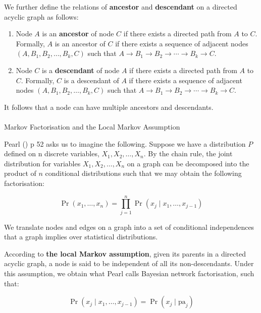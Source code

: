 \documentclass[
  single column]{article}
\makeatletter
\let\oldparagraph\paragraph
\renewcommand{\paragraph}{
    \@ifstar
      \xxxParagraphStar
      \xxxParagraphNoStar
  }
\newcommand{\xxxParagraphStar}[1]{\oldparagraph*{#1}\mbox{}}
\newcommand{\xxxParagraphNoStar}[1]{\oldparagraph{#1}\mbox{}}
\providecommand{\tightlist}{%
  \setlength{\itemsep}{0pt}\setlength{\parskip}{0pt}}\usepackage{longtable,booktabs,array}
\makeatother
\begin{document}
We further define the relations of \textbf{ancestor} and
\textbf{descendant} on a directed acyclic graph as follows:

\begin{enumerate}
\def\labelenumi{\arabic{enumi}.}
\tightlist
\item
  Node \(A\) is an \textbf{ancestor} of node \(C\) if there exists a
  directed path from \(A\) to \(C\). Formally, \(A\) is an ancestor of
  \(C\) if there exists a sequence of adjacent nodes
  \((A, B_1, B_2, \ldots, B_k, C)\) such that
  \(A \rightarrow B_1 \rightarrow B_2 \rightarrow \cdots \rightarrow B_k \rightarrow C\).
\item
  Node \(C\) is a \textbf{descendant} of node \(A\) if there exists a
  directed path from \(A\) to \(C\). Formally, \(C\) is a descendant of
  \(A\) if there exists a sequence of adjacent nodes
  \((A, B_1, B_2, \ldots, B_k, C)\) such that
  \(A \rightarrow B_1 \rightarrow B_2 \rightarrow \cdots \rightarrow B_k \rightarrow C\).
\end{enumerate}

It follows that a node can have multiple ancestors and descendants.

\paragraph{Markov Factorisation and the Local Markov
Assumption}\label{markov-factorisation-and-the-local-markov-assumption}

Pearl () p 52 asks us to imagine the
following. Suppose we have a distribution \(P\) defined on n discrete
variables, \(X_1, X_2, \dots, X_n\). By the chain rule, the joint
distribution for variables \(X_1, X_2, \dots, X_n\) on a graph can be
decomposed into the product of \(n\) conditional distributions such that
we may obtain the following factorisation:

\[
\Pr(x_1, \dots, x_n) = \prod_{j=1}^n \Pr(x_j \mid x_1, \dots, x_{j-1})
\]

We translate nodes and edges on a graph into a set of conditional
independences that a graph implies over statistical distributions.

According to \textbf{the local Markov assumption}, given its parents in
a directed acyclic graph, a node is said to be independent of all its
non-descendants. Under this assumption, we obtain what Pearl calls
Bayesian network factorisation, such that:

\[
\Pr(x_j \mid x_1, \dots, x_{j-1}) = \Pr(x_j \mid \text{pa}_j)
\]
\end{document}
